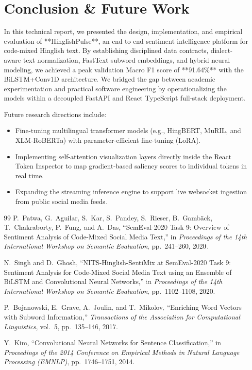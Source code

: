 \documentclass[11pt,a4paper]{article}
\begin{document}
\section{Conclusion \& Future Work}

In this technical report, we presented the design, implementation, and empirical evaluation of **HinglishPulse**, an end-to-end sentiment intelligence platform for code-mixed Hinglish text. By establishing disciplined data contracts, dialect-aware text normalization, FastText subword embeddings, and hybrid neural modeling, we achieved a peak validation Macro F1 score of **91.64\%** with the BiLSTM+Conv1D architecture. We bridged the gap between academic experimentation and practical software engineering by operationalizing the models within a decoupled FastAPI and React TypeScript full-stack deployment.

Future research directions include:
\begin{itemize}
    \item Fine-tuning multilingual transformer models (e.g., HingBERT, MuRIL, and XLM-RoBERTa) with parameter-efficient fine-tuning (LoRA).
    \item Implementing self-attention visualization layers directly inside the React Token Inspector to map gradient-based saliency scores to individual tokens in real time.
    \item Expanding the streaming inference engine to support live websocket ingestion from public social media feeds.
\end{itemize}

\begin{thebibliography}{99}
P.~Patwa, G.~Aguilar, S.~Kar, S.~Pandey, S.~Rieser, B.~Gamb{\"a}ck, T.~Chakraborty, P.~Fung, and A.~Das,
``SemEval-2020 Task 9: Overview of Sentiment Analysis of Code-Mixed Social Media Text,''
in \textit{Proceedings of the 14th International Workshop on Semantic Evaluation}, pp.~241--260, 2020.

N.~Singh and D.~Ghosh,
``NITS-Hinglish-SentiMix at SemEval-2020 Task 9: Sentiment Analysis for Code-Mixed Social Media Text using an Ensemble of BiLSTM and Convolutional Neural Networks,''
in \textit{Proceedings of the 14th International Workshop on Semantic Evaluation}, pp.~1102--1108, 2020.

P.~Bojanowski, E.~Grave, A.~Joulin, and T.~Mikolov,
``Enriching Word Vectors with Subword Information,''
\textit{Transactions of the Association for Computational Linguistics}, vol.~5, pp.~135--146, 2017.

Y.~Kim,
``Convolutional Neural Networks for Sentence Classification,''
in \textit{Proceedings of the 2014 Conference on Empirical Methods in Natural Language Processing (EMNLP)}, pp.~1746--1751, 2014.
\end{thebibliography}
\end{document}
